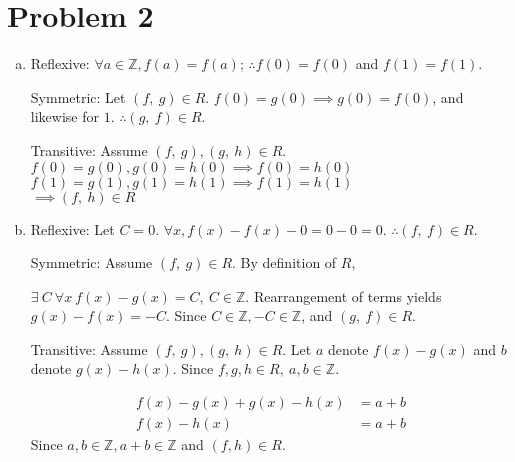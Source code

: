 \documentclass[11pt]{article}
\begin{document}
\section*{Problem 2}
	\begin{enumerate}[(a)]
	
	\item
	
	Reflexive: $\forall a \in \mathbb{Z}, f(a) = f(a)$; $\therefore f(0) = f(0)$ 
	and $f(1) = f(1)$.

	Symmetric: Let $(f,\ g) \in R$. $f(0) = g(0) \implies g(0) = f(0)$, and 
	likewise for $1$. $\therefore (g,\ f) \in R$.
	
	Transitive: Assume $(f,\ g), (g,\ h) \in R$.\\
	$f(0) = g(0), g(0) = h(0) \implies f(0) = h(0)$\\
	$f(1) = g(1), g(1) = h(1) \implies f(1) = h(1)$\\
	$\implies (f,\ h) \in R$
	
	\item
	Reflexive: Let $C = 0$. $\forall x, f(x) -f(x) - 0 = 0-0 = 0$. $\therefore 
	(f,\ f) \in R$.
	
	Symmetric: Assume $(f,\ g) \in R$. By definition of $R$,
	
	$\exists\ C\ \forall x\ f(x) -g(x) = C,\ C \in \mathbb{Z}$. Rearrangement of 
	terms yields $g(x) -f(x) = -C$. Since $C \in \mathbb{Z}, -C \in \mathbb{Z}$, 
	and $(g,\ f) \in R$.
	
	Transitive: Assume $(f,\ g), (g,\ h) \in R$. Let $a$ denote $f(x)-g(x)$ and 
	$b$ denote $g(x)-h(x)$. Since $f, g, h \in R,\ a, b\in \mathbb{Z}$.
	
	\begin{align*}
	f(x) - g(x) + g(x) -h(x) &= a + b\\
	f(x) -h(x) &= a + b
	\end{align*}
	Since $a, b\in \mathbb{Z}, a+b \in \mathbb{Z}$ and $(f, h) \in R$.

	\end{enumerate}
	
\end{document}

